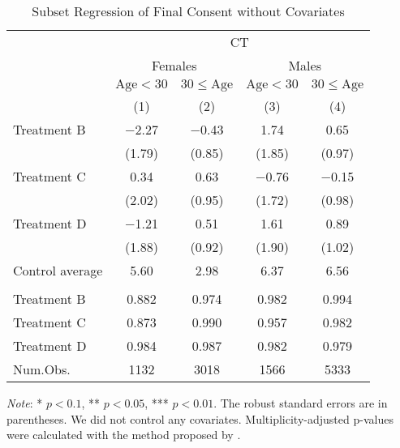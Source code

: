 \documentclass[12pt, a4paper]{article}
\begin{document}
\begin{table}[H]

\caption{\label{tab:consent-lm-subset1}Subset Regression of Final Consent without Covariates}
\centering
\fontsize{8}{10}\selectfont
\begin{threeparttable}
\begin{tabular}[t]{lcccc}
\toprule
\multicolumn{1}{c}{ } & \multicolumn{4}{c}{CT} \\
\cmidrule(l{3pt}r{3pt}){2-5}
\multicolumn{1}{c}{ } & \multicolumn{2}{c}{Females} & \multicolumn{2}{c}{Males} \\
\cmidrule(l{3pt}r{3pt}){2-3} \cmidrule(l{3pt}r{3pt}){4-5}
\multicolumn{1}{c}{ } & \multicolumn{1}{c}{$\text{Age} < 30$} & \multicolumn{1}{c}{$30 \le \text{Age}$} & \multicolumn{1}{c}{$\text{Age} < 30$} & \multicolumn{1}{c}{$30 \le \text{Age}$} \\
\cmidrule(l{3pt}r{3pt}){2-2} \cmidrule(l{3pt}r{3pt}){3-3} \cmidrule(l{3pt}r{3pt}){4-4} \cmidrule(l{3pt}r{3pt}){5-5}
  & (1) & (2) & (3) & (4)\\
\midrule
Treatment B & \num{-2.27} & \num{-0.43} & \num{1.74} & \num{0.65}\\
 & (\num{1.79}) & (\num{0.85}) & (\num{1.85}) & (\num{0.97})\\
Treatment C & \num{0.34} & \num{0.63} & \num{-0.76} & \num{-0.15}\\
 & (\num{2.02}) & (\num{0.95}) & (\num{1.72}) & (\num{0.98})\\
Treatment D & \num{-1.21} & \num{0.51} & \num{1.61} & \num{0.89}\\
 & (\num{1.88}) & (\num{0.92}) & (\num{1.90}) & (\num{1.02})\\
\midrule
Control average & 5.60 & 2.98 & 6.37 & 6.56\\
\addlinespace[0.3em]
\multicolumn{5}{l}{\textit{Multiplicity-adjusted p-values}}\\
\hspace{1em}Treatment B & 0.882 & 0.974 & 0.982 & 0.994\\
\hspace{1em}Treatment C & 0.873 & 0.990 & 0.957 & 0.982\\
\hspace{1em}Treatment D & 0.984 & 0.987 & 0.982 & 0.979\\
Num.Obs. & \num{1132} & \num{3018} & \num{1566} & \num{5333}\\
\bottomrule
\end{tabular}
\begin{tablenotes}
\item \emph{Note}: * $p < 0.1$, ** $p < 0.05$, *** $p < 0.01$. The robust standard errors are in parentheses. We did not control any covariates. Multiplicity-adjusted p-values were calculated with the method proposed by \cite{List2019}.
\end{tablenotes}
\end{threeparttable}
\end{table}
\end{document}

